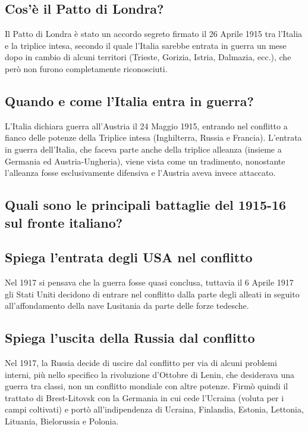 \documentclass{article}
\begin{document}
\subsection{Cos'è il Patto di Londra?}
Il Patto di Londra è stato un accordo segreto firmato il 26 Aprile 1915 tra l'Italia e la triplice intesa, secondo il quale
l'Italia sarebbe entrata in guerra un mese dopo in cambio di alcuni territori (Trieste, Gorizia, Istria, Dalmazia, ecc.),
che però non furono completamente riconosciuti.

\subsection{Quando e come l'Italia entra in guerra?}
L'Italia dichiara guerra all'Austria il 24 Maggio 1915, entrando nel conflitto a fianco delle potenze della Triplice intesa
(Inghilterra, Russia e Francia). L'entrata in guerra dell'Italia, che faceva parte anche della triplice alleanza (insieme a
Germania ed Austria-Ungheria), viene vista come un tradimento, nonostante l'alleanza fosse esclusivamente difensiva e
l'Austria aveva invece attaccato.

\subsection{Quali sono le principali battaglie del 1915-16 sul fronte italiano?}

\subsection{Spiega l'entrata degli USA nel conflitto}
Nel 1917 si pensava che la guerra fosse quasi conclusa, tuttavia il 6 Aprile 1917 gli Stati Uniti decidono di entrare nel
conflitto dalla parte degli alleati in seguito all'affondamento della nave Lusitania da parte delle forze tedesche.

\subsection{Spiega l'uscita della Russia dal conflitto}
Nel 1917, la Russia decide di uscire dal conflitto per via di alcuni problemi interni, più nello specifico la rivoluzione
d'Ottobre di Lenin, che desiderava una guerra tra classi, non un conflitto mondiale con altre potenze. Firmò quindi il
trattato di Brest-Litovsk con la Germania in cui cede l'Ucraina (voluta per i campi coltivati) e portò all'indipendenza
di Ucraina, Finlandia, Estonia, Lettonia, Lituania, Bielorussia e Polonia.
\end{document}
